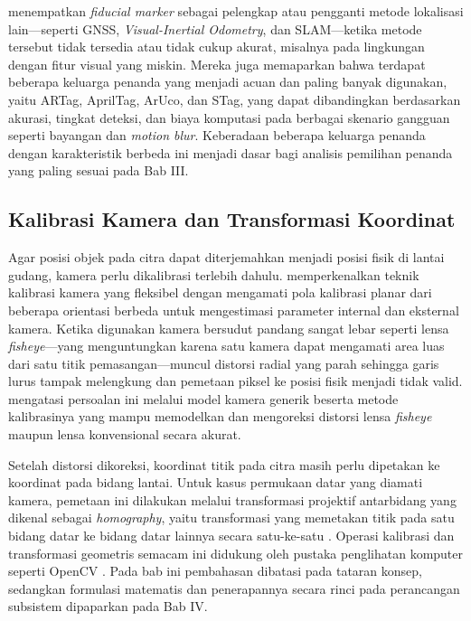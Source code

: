 \textcite{kalaitzakis2021} menempatkan \textit{fiducial marker} sebagai pelengkap atau pengganti metode lokalisasi lain---seperti GNSS, \textit{Visual-Inertial Odometry}, dan SLAM---ketika metode tersebut tidak tersedia atau tidak cukup akurat, misalnya pada lingkungan dengan fitur visual yang miskin. Mereka juga memaparkan bahwa terdapat beberapa keluarga penanda yang menjadi acuan dan paling banyak digunakan, yaitu ARTag, AprilTag, ArUco, dan STag, yang dapat dibandingkan berdasarkan akurasi, tingkat deteksi, dan biaya komputasi pada berbagai skenario gangguan seperti bayangan dan \textit{motion blur}. Keberadaan beberapa keluarga penanda dengan karakteristik berbeda ini menjadi dasar bagi analisis pemilihan penanda yang paling sesuai pada Bab III.

\subsection{Kalibrasi Kamera dan Transformasi Koordinat}

Agar posisi objek pada citra dapat diterjemahkan menjadi posisi fisik di lantai gudang, kamera perlu dikalibrasi terlebih dahulu. \textcite{zhang2000} memperkenalkan teknik kalibrasi kamera yang fleksibel dengan mengamati pola kalibrasi planar dari beberapa orientasi berbeda untuk mengestimasi parameter internal dan eksternal kamera. Ketika digunakan kamera bersudut pandang sangat lebar seperti lensa \textit{fisheye}---yang menguntungkan karena satu kamera dapat mengamati area luas dari satu titik pemasangan---muncul distorsi radial yang parah sehingga garis lurus tampak melengkung dan pemetaan piksel ke posisi fisik menjadi tidak valid. \textcite{kannala2006} mengatasi persoalan ini melalui model kamera generik beserta metode kalibrasinya yang mampu memodelkan dan mengoreksi distorsi lensa \textit{fisheye} maupun lensa konvensional secara akurat.

Setelah distorsi dikoreksi, koordinat titik pada citra masih perlu dipetakan ke koordinat pada bidang lantai. Untuk kasus permukaan datar yang diamati kamera, pemetaan ini dilakukan melalui transformasi projektif antarbidang yang dikenal sebagai \textit{homography}, yaitu transformasi yang memetakan titik pada satu bidang datar ke bidang datar lainnya secara satu-ke-satu \autocite{hartley2004}. Operasi kalibrasi dan transformasi geometris semacam ini didukung oleh pustaka penglihatan komputer seperti OpenCV \autocite{bradski2000}. Pada bab ini pembahasan dibatasi pada tataran konsep, sedangkan formulasi matematis dan penerapannya secara rinci pada perancangan subsistem dipaparkan pada Bab IV.

